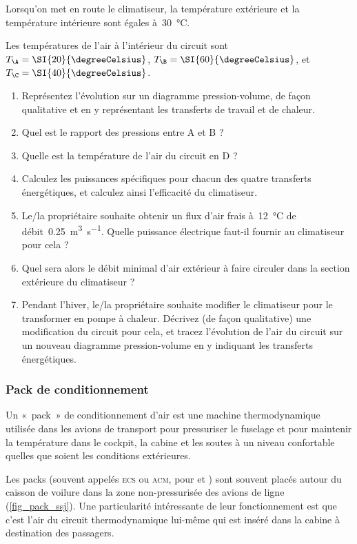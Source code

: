 	Lorsqu’on met en route le climatiseur, la température extérieure et la température intérieure sont égales à~\SI{30}{\degreeCelsius}.
 
	Les températures de l’air à l’intérieur du circuit sont $T_\A = \SI{20}{\degreeCelsius}$, $T_\B = \SI{60}{\degreeCelsius}$, et~$T_\C = \SI{40}{\degreeCelsius}$.

	\begin{enumerate}
		\item Représentez l’évolution sur un diagramme pression-volume, de façon qualitative et en y représentant les transferts de travail et de chaleur.
		\item Quel est le rapport des pressions entre A et B ?
		\item Quelle est la température de l’air du circuit en D ?
		\item Calculez les puissances spécifiques pour chacun des quatre transferts énergétiques, et calculez ainsi l’efficacité du climatiseur.
		\item Le/la propriétaire souhaite obtenir un flux d’air frais à~\SI{12}{\degreeCelsius} de débit~\SI{0,25}{\metre\cubed\per\second}. Quelle puissance électrique faut-il fournir au climatiseur pour cela ?
		\item Quel sera alors le débit minimal d’air extérieur à faire circuler dans la section extérieure du climatiseur ?
		\item Pendant l’hiver, le/la propriétaire souhaite modifier le climatiseur pour le transformer en pompe à chaleur. Décrivez (de façon qualitative) une modification du circuit pour cela, et tracez l’évolution de l’air du circuit sur un nouveau diagramme pression-volume en y indiquant les transferts énergétiques.
	\end{enumerate}


\subsubsection{Pack de conditionnement}
\label{exo_pack_conditonnement}

	Un «~pack~» de conditionnement d’air est une machine thermodynamique utilisée dans les avions de transport pour pressuriser le fuselage et pour maintenir la température dans le cockpit, la cabine et les soutes à un niveau confortable quelles que soient les conditions extérieures.
	
	Les packs (souvent appelés \textsc{ecs} ou \textsc{acm}, pour  et ) sont souvent placés autour du caisson de voilure dans la zone non-pressurisée des avions de ligne (\cref{fig_pack_ssj}). Une particularité intéressante de leur fonctionnement est que c’est l’air du circuit thermodynamique lui-même qui est inséré dans la cabine à destination des passagers.
	

